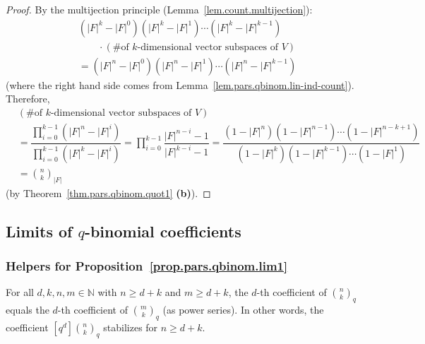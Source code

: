 \begin{proof}
By the multijection principle (Lemma~\ref{lem.count.multijection}):
\begin{align*}
&  \left(  \left\vert F\right\vert ^{k}-\left\vert F\right\vert ^{0}\right)
\left(  \left\vert F\right\vert ^{k}-\left\vert F\right\vert ^{1}\right)
\cdots\left(  \left\vert F\right\vert ^{k}-\left\vert F\right\vert
^{k-1}\right) \\
&  \qquad\cdot\left(  \text{\# of }k\text{-dimensional vector
subspaces of }V\right) \\
&  =\left(  \left\vert F\right\vert ^{n}-\left\vert F\right\vert ^{0}\right)
\left(  \left\vert F\right\vert ^{n}-\left\vert F\right\vert ^{1}\right)
\cdots\left(  \left\vert F\right\vert ^{n}-\left\vert F\right\vert
^{k-1}\right)
\end{align*}
(where the right hand side comes from Lemma~\ref{lem.pars.qbinom.lin-ind-count}).
Therefore,
\begin{align*}
&  \left(  \text{\# of }k\text{-dimensional vector subspaces of }V\right) \\
&  =\dfrac{\prod_{i=0}^{k-1}\left(  \left\vert F\right\vert ^{n}-\left\vert
F\right\vert ^{i}\right)  }{\prod_{i=0}^{k-1}\left(  \left\vert F\right\vert
^{k}-\left\vert F\right\vert ^{i}\right)  }
=\prod_{i=0}^{k-1}
\dfrac{\left\vert F\right\vert ^{n-i}-1}{\left\vert F\right\vert ^{k-i}-1}
=\dfrac{\left(  1-\left\vert F\right\vert ^{n}\right)  \left(  1-\left\vert
F\right\vert ^{n-1}\right)  \cdots\left(  1-\left\vert F\right\vert
^{n-k+1}\right)  }{\left(  1-\left\vert F\right\vert ^{k}\right)  \left(
1-\left\vert F\right\vert ^{k-1}\right)  \cdots\left(  1-\left\vert
F\right\vert ^{1}\right)  }\\
&  =\binom{n}{k}_{\left\vert F\right\vert }
\end{align*}
(by Theorem~\ref{thm.pars.qbinom.quot1} \textbf{(b)}).
\end{proof}

\subsection{Limits of $q$-binomial coefficients}

\subsubsection{Helpers for Proposition~\ref{prop.pars.qbinom.lim1}}

\begin{lemma}
\label{lem.qbinomial-formulas.coeff-stability}
\leanhelper
\leanok
For all $d, k, n, m \in \mathbb{N}$ with $n \ge d + k$ and $m \ge d + k$,
the $d$-th coefficient of $\binom{n}{k}_q$ equals the $d$-th coefficient of $\binom{m}{k}_q$
(as power series).
In other words, the coefficient $[q^d]\binom{n}{k}_q$ stabilizes for $n \ge d+k$.
\end{lemma}

